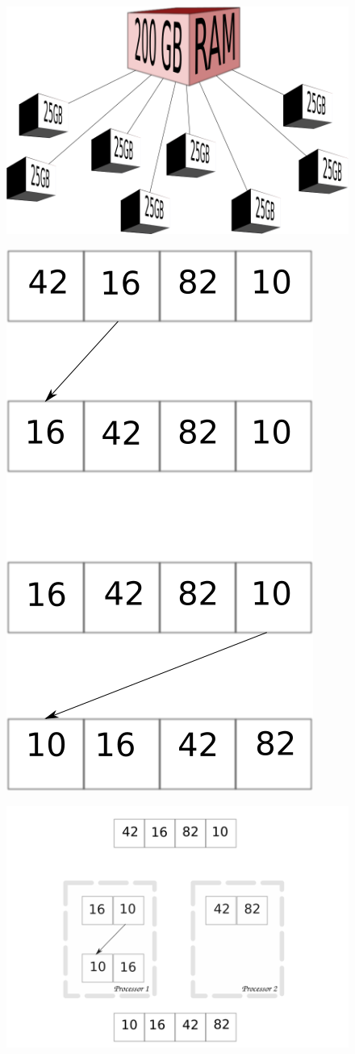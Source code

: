 \begin{frame}
		\begin{figure}
				\includegraphics[width=0.8\linewidth]{figures/diagrams/splitmem/memsplit}
		\end{figure}
\end{frame}

\begin{frame}
		\begin{figure}
			\includegraphics[width=0.3\linewidth]{figures/diagrams/sort/serialsort}
		\end{figure}
\end{frame}

\begin{frame}
		\begin{figure}
				\includegraphics[width=0.8\linewidth]{figures/diagrams/sort/parallelsort}
		\end{figure}
\end{frame}

